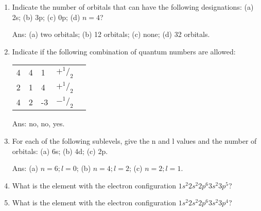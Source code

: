 \documentclass[main.tex]{subfiles}
\begin{document}
\begin{multicols*}{2}
\begin{enumerate}
\item Indicate the number of orbitals that can have the following designations: (a) 2s; (b) 3p; (c) 0p; (d) $n=4$?
  \begin{flushright}\small Ans:  (a) two orbitals; (b) 12 orbitals; (c) none; (d) 32 orbitals. \end{flushright}

\item Indicate if the following combination of quantum numbers are allowed:\\
\begin{tabularx}{\columnwidth}{>{}m{.20\linewidth} *{4}{Y} }
  \toprule
{} &   &   &  &    \\
    	&	4	&	1	&	$+^1/_2$    \\
   2	&	1&		4	&	$+^1/_2$   \\
4		&2	&	-3	&	$-^1/_2$\\    
    \bottomrule
\end{tabularx}
  \begin{flushright}\small Ans:  no, no, yes. \end{flushright}

\item For each of the following sublevels, give the n and l values and the number of orbitals: (a) 6s; (b) 4d; (c) 2p.
  \begin{flushright}\small Ans: (a) $n=6;l=0$; (b) $n=4;l=2$; (c) $n=2;l=1$. \end{flushright}

\item What is the element with the electron configuration $1s^2 2s^2 2p^6 3s^2 3p^5$?
\begin{enumerate}[label=(\alph*)]
\end{enumerate}

\item What is the element with the electron configuration $1s^2 2s^2 2p^6 3s^2 3p^4$?
\begin{enumerate}[label=(\alph*)]\begin{multicols*}{3}


\end{multicols*}
\end{enumerate}
\end{enumerate}
\end{multicols*}
\end{document}
